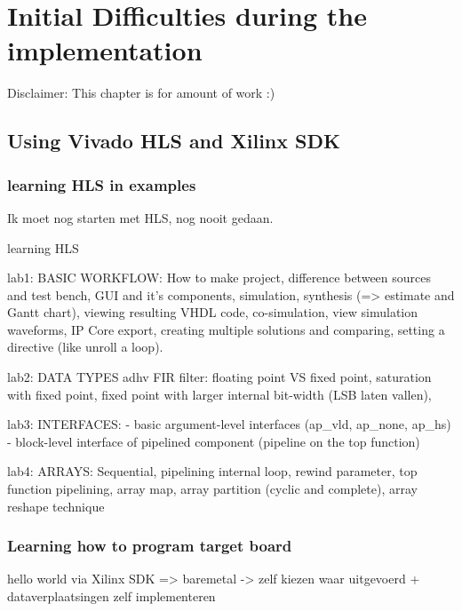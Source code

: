 
\chapter{Initial Difficulties during the implementation}

Disclaimer: This chapter is for amount of work :)

\section{Using Vivado HLS and Xilinx SDK}

\subsection{learning HLS in examples}

Ik moet nog starten met HLS, nog nooit gedaan.

learning HLS

lab1: BASIC WORKFLOW: How to make project, difference between sources and test bench, GUI and it's components, simulation, synthesis (=> estimate and Gantt chart), viewing resulting VHDL code, co-simulation, view simulation waveforms, IP Core export, creating multiple solutions and comparing, setting a directive (like unroll a loop).

lab2: DATA TYPES adhv FIR filter: floating point VS fixed point, saturation with fixed point, fixed point with larger internal bit-width (LSB laten vallen), 

lab3: INTERFACES:
- basic argument-level interfaces (ap\_vld, ap\_none, ap\_hs)
- block-level interface of pipelined component (pipeline on the top function)

lab4: ARRAYS: Sequential, pipelining internal loop, rewind parameter, top function pipelining, array map, array partition (cyclic and complete), array reshape technique

\subsection{Learning how to program target board}

hello world via Xilinx SDK => baremetal 
-> zelf kiezen waar uitgevoerd + dataverplaatsingen zelf implementeren


